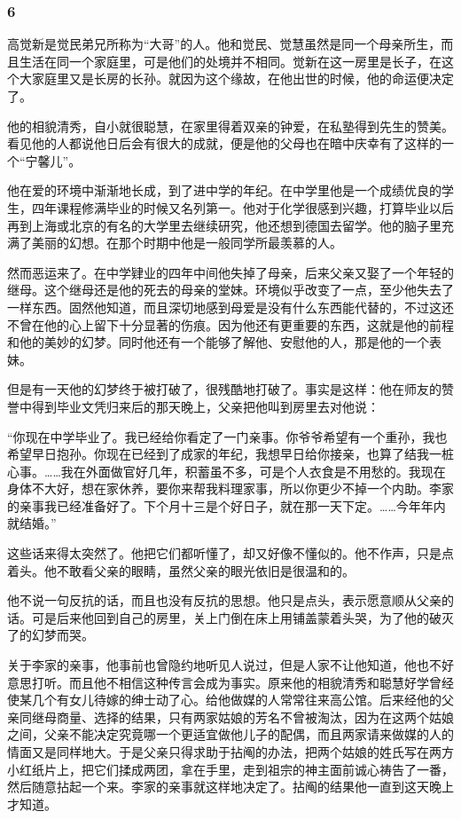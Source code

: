 \subsubsection*{6}

\par 高觉新是觉民弟兄所称为“大哥”的人。他和觉民、觉慧虽然是同一个母亲所生，而且生活在同一个家庭里，可是他们的处境并不相同。觉新在这一房里是长子，在这个大家庭里又是长房的长孙。就因为这个缘故，在他出世的时候，他的命运便决定了。
\par 他的相貌清秀，自小就很聪慧，在家里得着双亲的钟爱，在私塾得到先生的赞美。看见他的人都说他日后会有很大的成就，便是他的父母也在暗中庆幸有了这样的一个“宁馨儿”。
\par 他在爱的环境中渐渐地长成，到了进中学的年纪。在中学里他是一个成绩优良的学生，四年课程修满毕业的时候又名列第一。他对于化学很感到兴趣，打算毕业以后再到上海或北京的有名的大学里去继续研究，他还想到德国去留学。他的脑子里充满了美丽的幻想。在那个时期中他是一般同学所最羡慕的人。
\par 然而恶运来了。在中学肄业的四年中间他失掉了母亲，后来父亲又娶了一个年轻的继母。这个继母还是他的死去的母亲的堂妹。环境似乎改变了一点，至少他失去了一样东西。固然他知道，而且深切地感到母爱是没有什么东西能代替的，不过这还不曾在他的心上留下十分显著的伤痕。因为他还有更重要的东西，这就是他的前程和他的美妙的幻梦。同时他还有一个能够了解他、安慰他的人，那是他的一个表妹。
\par 但是有一天他的幻梦终于被打破了，很残酷地打破了。事实是这样：他在师友的赞誉中得到毕业文凭归来后的那天晚上，父亲把他叫到房里去对他说：
\par “你现在中学毕业了。我已经给你看定了一门亲事。你爷爷希望有一个重孙，我也希望早日抱孙。你现在已经到了成家的年纪，我想早日给你接亲，也算了结我一桩心事。……我在外面做官好几年，积蓄虽不多，可是个人衣食是不用愁的。我现在身体不大好，想在家休养，要你来帮我料理家事，所以你更少不掉一个内助。李家的亲事我已经准备好了。下个月十三是个好日子，就在那一天下定。……今年年内就结婚。”
\par 这些话来得太突然了。他把它们都听懂了，却又好像不懂似的。他不作声，只是点着头。他不敢看父亲的眼睛，虽然父亲的眼光依旧是很温和的。
\par 他不说一句反抗的话，而且也没有反抗的思想。他只是点头，表示愿意顺从父亲的话。可是后来他回到自己的房里，关上门倒在床上用铺盖蒙着头哭，为了他的破灭了的幻梦而哭。
\par 关于李家的亲事，他事前也曾隐约地听见人说过，但是人家不让他知道，他也不好意思打听。而且他不相信这种传言会成为事实。原来他的相貌清秀和聪慧好学曾经使某几个有女儿待嫁的绅士动了心。给他做媒的人常常往来高公馆。后来经他的父亲同继母商量、选择的结果，只有两家姑娘的芳名不曾被淘汰，因为在这两个姑娘之间，父亲不能决定究竟哪一个更适宜做他儿子的配偶，而且两家请来做媒的人的情面又是同样地大。于是父亲只得求助于拈阄的办法，把两个姑娘的姓氏写在两方小红纸片上，把它们揉成两团，拿在手里，走到祖宗的神主面前诚心祷告了一番，然后随意拈起一个来。李家的亲事就这样地决定了。拈阄的结果他一直到这天晚上才知道。
